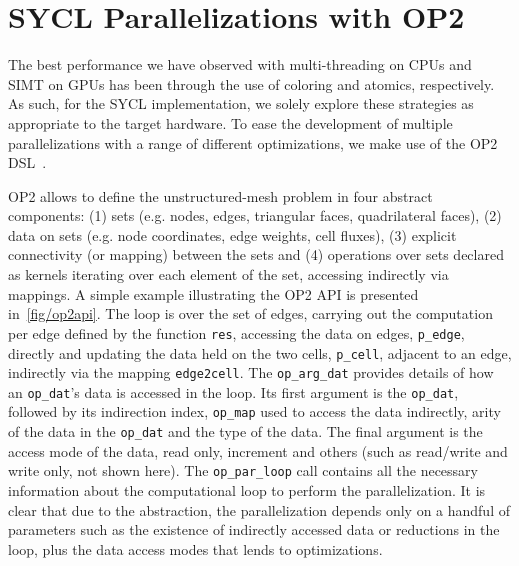 \documentclass[runningheads]{llncs}
\begin{document}
\vspace{-10pt}
\section{SYCL Parallelizations with OP2}\label{sec/op2sycl}
\vspace{-5pt}

\noindent The best performance we have observed with multi-threading on CPUs 
and SIMT on GPUs has been through the use of coloring and atomics, respectively. 
As such, for the SYCL implementation, we solely explore these strategies as 
appropriate to the target hardware. To ease the development of multiple 
parallelizations with a range of different optimizations, we make use of the 
OP2 DSL~\cite{op2repo,InPar2012}. 

OP2 allows to define the unstructured-mesh problem in four abstract components: 
(1) sets (e.g. nodes, edges, triangular faces, quadrilateral faces), (2) data on 
sets (e.g. node coordinates, edge weights, cell fluxes), (3) explicit 
connectivity (or mapping) between the sets and (4) operations over sets 
declared as kernels iterating over each element of the set, accessing indirectly 
via mappings. A simple example illustrating the OP2 API is presented 
in~\figurename{\ref{fig/op2api}}. The loop is over the set of edges, carrying 
out the computation per edge defined by the function \texttt{res}, accessing the 
data on edges, \texttt{p\_edge}, directly and  updating  the  data  held  on  
the  two  cells, \texttt{p\_cell}, adjacent to an edge, indirectly via the 
mapping \texttt{edge2cell}. The \texttt{op\_arg\_dat} provides details of how an 
\texttt{op\_dat}’s  data is accessed in the loop. Its first argument is the 
\texttt{op\_dat}, followed by its indirection index, \texttt{op\_map} used to 
access the data indirectly, arity of the data in the \texttt{op\_dat} and the 
type of the data. The final argument is the access mode of the data, read only, 
increment and others (such as read/write and write only, not shown here). The 
\texttt{op\_par\_loop} call contains  all  the  necessary information about the 
computational loop to perform the parallelization. It is clear that due to the 
abstraction, the parallelization depends only on a handful of parameters such as 
the existence of indirectly accessed data or reductions in the loop,  plus the 
data access modes that lends to optimizations. 
\end{document}
